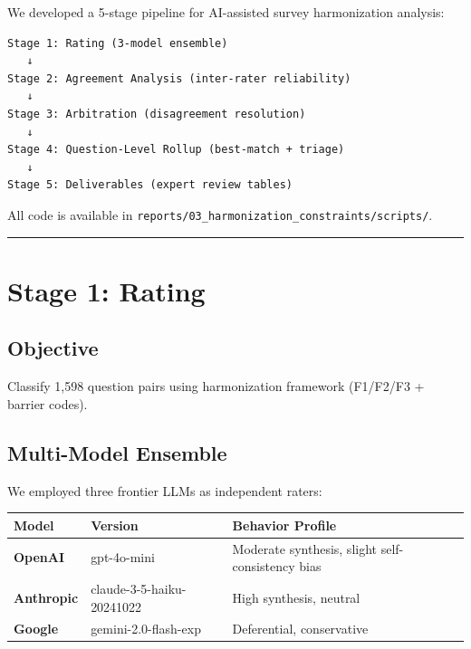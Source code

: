 \documentclass[
  letterpaper,
]{report}
\begin{document}
We developed a 5-stage pipeline for AI-assisted survey harmonization
analysis:

\begin{verbatim}
Stage 1: Rating (3-model ensemble)
   ↓
Stage 2: Agreement Analysis (inter-rater reliability)
   ↓
Stage 3: Arbitration (disagreement resolution)
   ↓
Stage 4: Question-Level Rollup (best-match + triage)
   ↓
Stage 5: Deliverables (expert review tables)
\end{verbatim}

All code is available in
\texttt{reports/03\_harmonization\_constraints/scripts/}.

\begin{center}\rule{0.5\linewidth}{0.5pt}\end{center}

\section{Stage 1: Rating}\label{stage-1-rating}

\subsection{Objective}\label{objective}

Classify 1,598 question pairs using harmonization framework (F1/F2/F3 +
barrier codes).

\subsection{Multi-Model Ensemble}\label{multi-model-ensemble}

We employed three frontier LLMs as independent raters:

\begin{longtable}[]{@{}
  >{\raggedright\arraybackslash}p{}
  >{\raggedright\arraybackslash}p{}
  >{\raggedright\arraybackslash}p{}@{}}
\toprule\noalign{}
\begin{minipage}[b]{\linewidth}\raggedright
Model
\end{minipage} & \begin{minipage}[b]{\linewidth}\raggedright
Version
\end{minipage} & \begin{minipage}[b]{\linewidth}\raggedright
Behavior Profile
\end{minipage} \\
\midrule\noalign{}
\endhead
\bottomrule\noalign{}
\endlastfoot
\textbf{OpenAI} & gpt-4o-mini & Moderate synthesis, slight
self-consistency bias \\
\textbf{Anthropic} & claude-3-5-haiku-20241022 & High synthesis,
neutral \\
\textbf{Google} & gemini-2.0-flash-exp & Deferential, conservative \\
\end{longtable}
\end{document}
